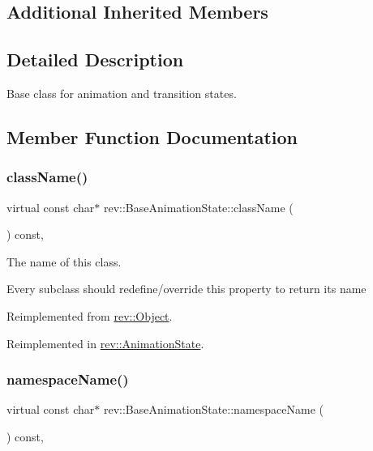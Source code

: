 \subsection*{Additional Inherited Members}


\subsection{Detailed Description}
Base class for animation and transition states. 

\subsection{Member Function Documentation}
\mbox{\label{classrev_1_1_base_animation_state_a40d8ab21aeed4a7d7e0f88004c08d060}} 
\subsubsection{\texorpdfstring{className()}{className()}}
{\footnotesize\ttfamily virtual const char$\ast$ rev\+::\+Base\+Animation\+State\+::class\+Name (\begin{DoxyParamCaption}{ }\end{DoxyParamCaption}) const\hspace{0.3cm}{\ttfamily [inline]}, {\ttfamily [virtual]}}



The name of this class. 

Every subclass should redefine/override this property to return its name 

Reimplemented from \mbox{\hyperlink{classrev_1_1_object_a7a2013f91169479b65cf93afdc5d9a68}{rev\+::\+Object}}.



Reimplemented in \mbox{\hyperlink{classrev_1_1_animation_state_a4d204d9ea91c34e1a546421dcc80f0e5}{rev\+::\+Animation\+State}}.

\mbox{\label{classrev_1_1_base_animation_state_a97dd6a934ca133d2024b1db68dd3316d}} 
\subsubsection{\texorpdfstring{namespaceName()}{namespaceName()}}
{\footnotesize\ttfamily virtual const char$\ast$ rev\+::\+Base\+Animation\+State\+::namespace\+Name (\begin{DoxyParamCaption}{ }\end{DoxyParamCaption}) const\hspace{0.3cm}{\ttfamily [inline]}, {\ttfamily [virtual]}}



